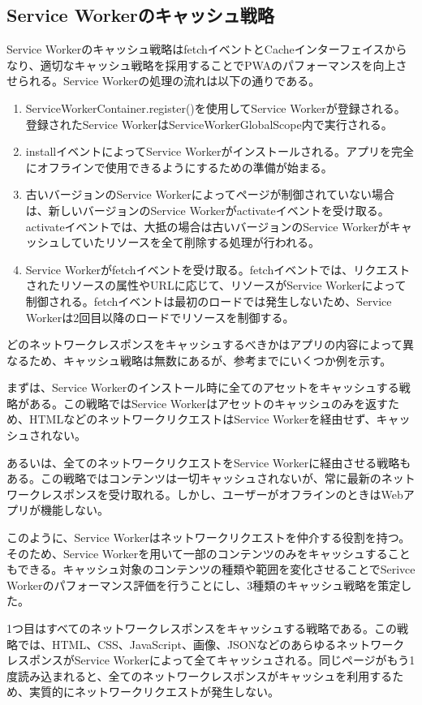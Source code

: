 \subsection{Service Workerのキャッシュ戦略}
\label{Service Workerのキャッシュ戦略}
Service Workerのキャッシュ戦略はfetchイベントとCacheインターフェイスからなり、適切なキャッシュ戦略を採用することでPWAのパフォーマンスを向上させられる。Service Workerの処理の流れは以下の通りである。
\begin{enumerate}
    \item ServiceWorkerContainer.register()を使用してService Workerが登録される。登録されたService WorkerはServiceWorkerGlobalScope内で実行される。
    \item installイベントによってService Workerがインストールされる。アプリを完全にオフラインで使用できるようにするための準備が始まる。
    \item 古いバージョンのService Workerによってページが制御されていない場合は、新しいバージョンのService Workerがactivateイベントを受け取る。activateイベントでは、大抵の場合は古いバージョンのService Workerがキャッシュしていたリソースを全て削除する処理が行われる。
    \item Service Workerがfetchイベントを受け取る。fetchイベントでは、リクエストされたリソースの属性やURLに応じて、リソースがService Workerによって制御される。fetchイベントは最初のロードでは発生しないため、Service Workerは2回目以降のロードでリソースを制御する。
\end{enumerate}
どのネットワークレスポンスをキャッシュするべきかはアプリの内容によって異なるため、キャッシュ戦略は無数にあるが、参考までにいくつか例を示す。

まずは、Service Workerのインストール時に全てのアセットをキャッシュする戦略がある。この戦略ではService Workerはアセットのキャッシュのみを返すため、HTMLなどのネットワークリクエストはService Workerを経由せず、キャッシュされない。

あるいは、全てのネットワークリクエストをService Workerに経由させる戦略もある。この戦略ではコンテンツは一切キャッシュされないが、常に最新のネットワークレスポンスを受け取れる。しかし、ユーザーがオフラインのときはWebアプリが機能しない。

このように、Service Workerはネットワークリクエストを仲介する役割を持つ。そのため、Service Workerを用いて一部のコンテンツのみをキャッシュすることもできる。キャッシュ対象のコンテンツの種類や範囲を変化させることでSerivce Workerのパフォーマンス評価を行うことにし、3種類のキャッシュ戦略を策定した。

1つ目はすべてのネットワークレスポンスをキャッシュする戦略である。この戦略では、HTML、CSS、JavaScript、画像、JSONなどのあらゆるネットワークレスポンスがService Workerによって全てキャッシュされる。同じページがもう1度読み込まれると、全てのネットワークレスポンスがキャッシュを利用するため、実質的にネットワークリクエストが発生しない。

